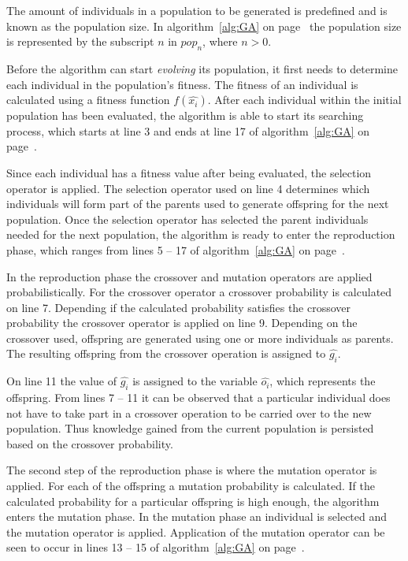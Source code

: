 The amount of individuals in a population to be generated is predefined and is known as the population size. In algorithm~\ref{alg:GA} on page~\pageref{alg:GA} the population size is represented by the subscript $n$ in $pop_n$, where $n > 0$.

Before the algorithm can start \emph{evolving} its population, it first needs to determine each individual in the population's fitness. The fitness of an individual is calculated using a fitness function $f(\hat{x_i})$. After each individual within the initial population has been evaluated, the algorithm is able to start its searching process, which starts at line 3 and ends at line 17 of algorithm~\ref{alg:GA} on page~\pageref{alg:GA}.

Since each individual has a fitness value after being evaluated, the selection operator is applied. The selection operator used on line 4 determines which individuals will form part of the parents used to generate offspring for the next population. Once the selection operator has selected the parent individuals needed for the next population, the algorithm is ready to enter the reproduction phase, which ranges from lines 5 -- 17 of algorithm~\ref{alg:GA} on page~\pageref{alg:GA}.

In the reproduction phase the crossover and mutation operators are applied probabilistically. For the crossover operator a crossover probability is calculated on line 7. Depending if the calculated probability satisfies the crossover probability the crossover operator is applied on line 9. Depending on the crossover used, offspring are generated using one or more individuals as parents. The resulting offspring from the crossover operation is assigned to $\hat{g_i}$.

On line 11 the value of $\hat{g_i}$ is assigned to the variable $\hat{o_i}$, which represents the offspring. From lines 7 -- 11 it can be observed that a particular individual does not have to take part in a crossover operation to be carried over to the new population. Thus knowledge gained from the current population is persisted based on the crossover probability.

The second step of the reproduction phase is where the mutation operator is applied. For each of the offspring a mutation probability is calculated. If the calculated probability for a particular offspring is high enough, the algorithm enters the mutation phase. In the mutation phase an individual is selected and the mutation operator is applied. Application of the mutation operator can be seen to occur in lines 13 -- 15 of algorithm~\ref{alg:GA} on page~\pageref{alg:GA}.


